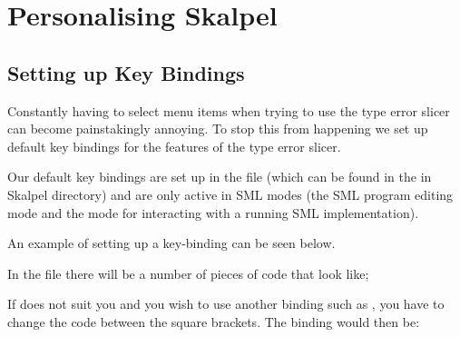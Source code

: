 \documentclass{report}
\begin{document}

\newpage


\section{Personalising Skalpel}


\subsection{Setting up Key Bindings}
\label{sec:setting-key-bindings}

Constantly having to select menu items when trying to use the type
error slicer can become painstakingly annoying.  To stop this from
happening we set up default key bindings for the features of the type
error slicer.


Our default key bindings are set up in the file
 (which can be found in the
 in Skalpel directory) and are only
active in SML modes (the SML program editing mode and the mode for
interacting with a running SML implementation).


\medskip
An example of setting up a key-binding can be seen below.

In the file  there will be a number of
pieces of code that look like;

If  does not suit you and you wish to use another
binding such as , you have to change the
code between the square brackets.  The binding would then be:
\end{document}

